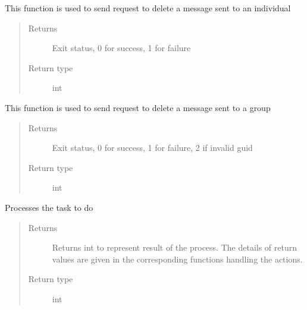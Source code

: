 \documentclass[letterpaper,10pt,english]{sphinxmanual}
\begin{document}
\begin{fulllineitems}
\begin{fulllineitems}
\label{\detokenize{Message:Message.Message._del_individual_message}}
This function is used to send request to delete a message sent to an individual
\begin{quote}\begin{description}
\item[{Returns}] \leavevmode
Exit status, 0 for success, 1 for failure

\item[{Return type}] \leavevmode
int

\end{description}\end{quote}

\end{fulllineitems}


\begin{fulllineitems}
\label{\detokenize{Message:Message.Message._del_group_message}}
This function is used to send request to delete a message sent to a group
\begin{quote}\begin{description}
\item[{Returns}] \leavevmode
Exit status, 0 for success, 1 for failure, 2 if invalid guid

\item[{Return type}] \leavevmode
int

\end{description}\end{quote}

\end{fulllineitems}


\begin{fulllineitems}
\label{\detokenize{Message:Message.Message.processTask}}
Processes the task to do
\begin{quote}\begin{description}
\item[{Returns}] \leavevmode
Returns int to represent result of the process. The details of return values are given in the corresponding functions handling the actions.

\item[{Return type}] \leavevmode
int

\end{description}\end{quote}

\end{fulllineitems}


\end{fulllineitems}
\end{document}
